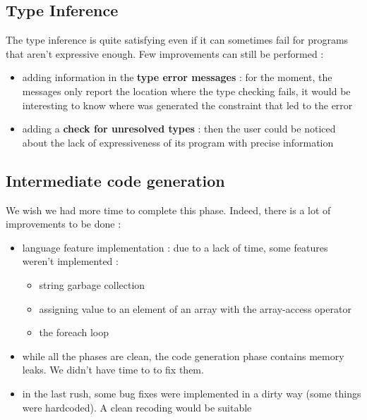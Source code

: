 \documentclass[a4paper,11pt]{article}
\begin{document}
\subsection{Type Inference}
The type inference is quite satisfying even if it can sometimes fail for programs that aren't expressive enough. Few improvements can still be performed :
\begin{itemize}
	\item adding information in the \textbf{type error messages} : for the moment, the messages only report the location where the type checking fails, it would be interesting to know where was generated the constraint that led to the error
	\item adding a \textbf{check for unresolved types} : then the user could be noticed about the lack of expressiveness of its program with precise information
\end{itemize} 
\subsection{Intermediate code generation}
We wish we had more time to complete this phase. Indeed, there is a lot of improvements to be done :
\begin{itemize}
	\item language feature implementation : due to a lack of time, some features weren't implemented :
	\begin{itemize}
		\item string garbage collection
		\item assigning value to an element of an array with the array-access operator 
		\item the foreach loop
	\end{itemize}
	\item while all the phases are clean, the code generation phase contains memory leaks. We didn't have time to to fix them.
	\item in the last rush, some bug fixes were implemented in a dirty way (some things were hardcoded). A clean recoding would be suitable
\end{itemize}
\end{document}
